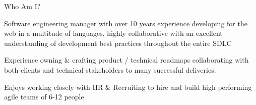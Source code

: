 \documentclass[9pt]{developercv} %
\begin{document}
\vspace{0.5cm}

\begin{cvsect}{Who Am I?}

  \begin{minipage}[t]{0.5\textwidth} %
    \vspace{-\baselineskip} %
  Software engineering manager with over 10 years experience developing for the web in a multitude of languages, highly collaborative with an excellent understanding of development best practices throughout the entire SDLC

  Experience owning \& crafting product / technical roadmaps collaborating with both clients and technical stakeholders to many successful deliveries.

  Enjoys working closely with HR \& Recruiting to hire and build high performing agile teams of 6-12 people
  \end{minipage}
  \hfill %
  \begin{minipage}[t]{0.4\textwidth} %
    \vspace{-\baselineskip} %
    \begin{barchart}{5.5}
    \end{barchart}
  \end{minipage}
\end{cvsect}


\end{document}
